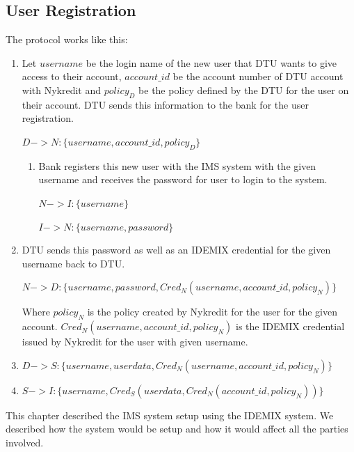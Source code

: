 \subsection{User Registration}
The protocol works like this:
\begin{enumerate} 
\item 	Let  $username$ be the login name of the new user that DTU wants to give access to their account, $account\_id$ be the account number of DTU account with Nykredit and $policy_D$ be the policy defined by the DTU for the user on their account. DTU sends this information to the bank for the user registration.

\begin{center}
	$D -> N : \{username,account\_id,policy_D\}$
\end{center}
\begin{enumerate}
	\item Bank registers this new user with the IMS system with the given username and receives the password for user to login to the system.
	\begin{center}
		$N -> I : \{username\}$
		
		$I -> N : \{username,password\}$
		
	\end{center}	
\end{enumerate}
\item DTU sends this password as well as an IDEMIX credential for the given username back to DTU.
	\begin{center}
		$N -> D : \{username,password,Cred_N(username,account\_id,policy_N)\}$
	\end{center}	
Where $policy_N$ is the policy created by Nykredit for the user for the given account. $Cred_N(username,account\_id,policy_N)$ is the IDEMIX credential issued by Nykredit for the user with given username.
\item 
	$D -> S : \{username,userdata,Cred_N(username,account\_id,policy_N)\}$
\item
	$S -> I : \{username,Cred_S(userdata,Cred_N(account\_id,policy_N))\}$
\end{enumerate}

This chapter described the IMS system setup using the IDEMIX system. We described how the system would be setup and how it would affect all the parties involved.


